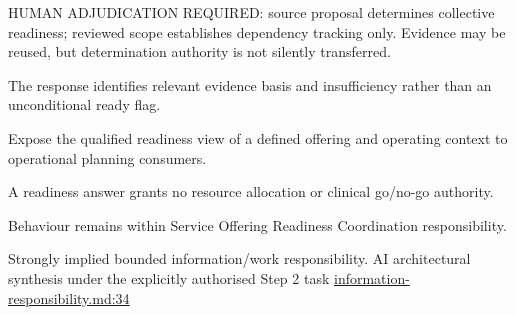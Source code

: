HUMAN ADJUDICATION REQUIRED: source proposal determines collective readiness; reviewed scope establishes dependency tracking only. Evidence may be reused, but determination authority is not silently transferred.



The response identifies relevant evidence basis and insufficiency rather than an unconditional ready flag.



Expose the qualified readiness view of a defined offering and operating context to operational planning consumers.



A readiness answer grants no resource allocation or clinical go/\allowbreak{}no-go authority.



Behaviour remains within Service Offering Readiness Coordination responsibility.


Strongly implied bounded information/work responsibility. AI architectural synthesis under the explicitly authorised Step 2 task \hyperref[evidence:be61392fefb4bb10]{information-responsibility.md:34}
